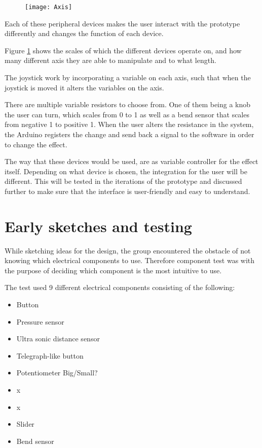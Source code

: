 \begin{figure}[!h] 
\centering
\texttt{[image: Axis]}
\caption{\label{fig:axis}}
\end{figure}



Each of these peripheral devices makes the user interact with the prototype differently and changes the function of each device.

Figure \ref{fig:axis} shows the scales of which the different devices operate on, and how many different axis they are able to manipulate and to what length.
 
The joystick work by incorporating a variable on each axis, such that when the joystick is moved it alters the variables on the axis. 

There are multiple variable resistors to choose from. One of them being a knob the user can turn, which scales from 0 to 1 as well as a bend sensor that scales from negative 1 to positive 1. When the user alters the resistance in the system, the Arduino registers the change and send back a signal to the software in order to change the effect.

The way that these devices would be used, are as variable controller for the effect itself. Depending on what device is chosen, the integration for the user will be different. This will be tested in the iterations of the prototype and discussed further to make sure that the interface is user-friendly and easy to understand. 


\section{Early sketches and testing}
While sketching ideas for the design, the group encountered the obstacle of not knowing which electrical components to use. Therefore component test was with the purpose of deciding which component is the most intuitive to use. 

The test used 9 different electrical components consisting of the following:
\begin{itemize}
\item Button
\item Pressure sensor
\item Ultra sonic distance sensor
\item Telegraph-like button
\item Potentiometer Big/Small?
\item x
\item x
\item Slider
\item Bend sensor
\end{itemize}

